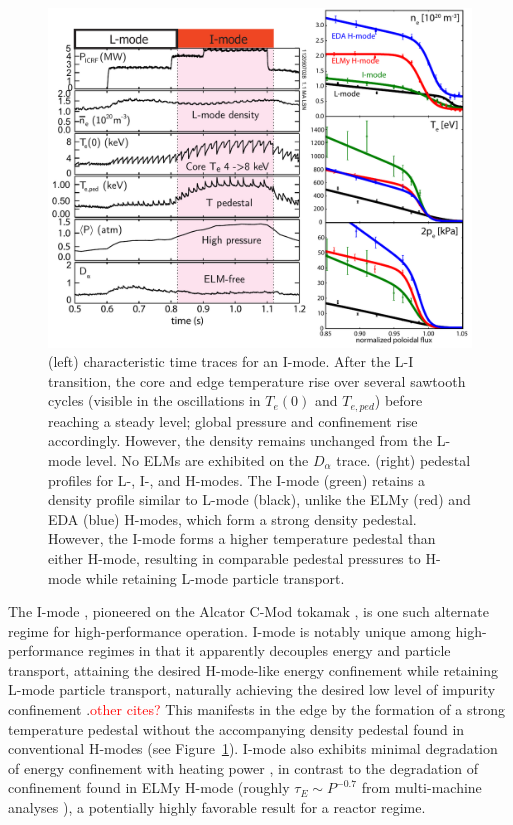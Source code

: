 \documentclass[12pt,floatfix,showpacs]{revtex4-1}
\newcommand{\note}[1]{\textcolor{red}{#1}}
\begin{document}
\begin{figure}[p] %
 \includegraphics[width=\textwidth]{trace_imode.pdf}
 \caption{(left) characteristic time traces for an I-mode.  After the L-I transition, the core and edge temperature rise over several sawtooth cycles (visible in the oscillations in $T_e(0)$ and $T_{e,ped}$) before reaching a steady level; global pressure and confinement rise accordingly.  However, the density remains unchanged from the L-mode level.  No ELMs are exhibited on the $D_\alpha$ trace.  (right) pedestal profiles for L-, I-, and H-modes.  The I-mode (green) retains a density profile similar to L-mode (black), unlike the ELMy (red) and EDA (blue) H-modes, which form a strong density pedestal.  However, the I-mode forms a higher temperature pedestal than either H-mode, resulting in comparable pedestal pressures to H-mode while retaining L-mode particle transport.}
 \label{fig:imode_trace}
\end{figure}

The I-mode \cite{Whyte2010,Hubbard2011,Walk2014,Walk2014b}, pioneered on the Alcator C-Mod tokamak \cite{Hutchinson1994}, is one such alternate regime for high-performance operation.  
I-mode is notably unique among high-performance regimes in that it apparently decouples energy and particle transport, attaining the desired H-mode-like energy confinement while retaining L-mode particle transport, naturally achieving the desired low level of impurity confinement \cite{Howard2011}.\note{other cites?}  
This manifests in the edge by the formation of a strong temperature pedestal without the accompanying density pedestal found in conventional H-modes (see Figure~\ref{fig:imode_trace}).  
I-mode also exhibits minimal degradation of energy confinement with heating power \cite{Whyte2010,Dominguez2012,Walk2014b}, in contrast to the degradation of confinement found in ELMy H-mode (roughly $\tau_E \sim P^{-0.7}$ from multi-machine analyses \cite{Christiansen1992,ITER1999}), a potentially highly favorable result for a reactor regime.
\end{document}
